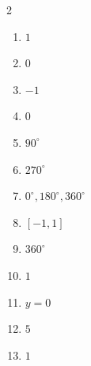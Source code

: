 \documentclass[11pt]{article}
\begin{document}
\begin{keybox}
\begin{multicols}{2}
\small
\begin{enumerate}[leftmargin=*,itemsep=3pt]
  \item $1$
  \item $0$
  \item $-1$
  \item $0$
  \item $90^\circ$
  \item $270^\circ$
  \item $0^\circ,180^\circ,360^\circ$
  \item $[-1,1]$
  \item $360^\circ$
  \item $1$
  \item $y=0$
  \item $5$
  \item $1$
\end{enumerate}
\end{multicols}
\end{keybox}
\end{document}
